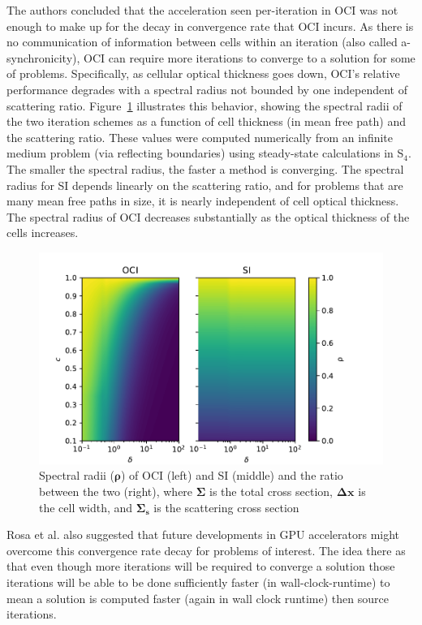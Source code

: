 The authors concluded that the acceleration seen per-iteration in OCI was not enough to make up for the decay in convergence rate that OCI incurs.
As there is no communication of information between cells within an iteration (also called a-synchronicity), OCI can require more iterations to converge to a solution for some of problems. 
Specifically, as cellular optical thickness goes down, OCI's relative performance degrades with a spectral radius not bounded by one independent of scattering ratio.
Figure~\ref{fig:specrad} illustrates this behavior, showing the spectral radii of the two iteration schemes as a function of cell thickness (in mean free path) and the scattering ratio.
These values were computed numerically from an infinite medium problem (via reflecting boundaries) using steady-state calculations in S$_4$. 
The smaller the spectral radius, the faster a method is converging.
The spectral radius for SI depends linearly on the scattering ratio, and for problems that are many mean free paths in size, it is nearly independent of cell optical thickness. 
The spectral radius of OCI decreases substantially as the optical thickness of the cells increases.
\begin{figure}[!htb]
    \centering
    \includegraphics[width=\textwidth]{deterministic/therefore_paper/therefore_figs/ss_specrads.pdf}
    \caption{Spectral radii ($\boldsymbol{\rho}$) of OCI (left) and SI (middle) and the ratio between the two (right), where $\boldsymbol{\Sigma}$ is the total cross section, $\boldsymbol{\Delta x}$ is the cell width, and $\boldsymbol{\Sigma_s}$ is the scattering cross section}
    \label{fig:specrad}
  \end{figure}
Rosa et al. also suggested that future developments in GPU accelerators might overcome this convergence rate decay for problems of interest.
The idea there as that even though more iterations will be required to converge a solution those iterations will be able to be done sufficiently faster (in wall-clock-runtime) to mean a solution is computed faster (again in wall clock runtime) then source iterations.

